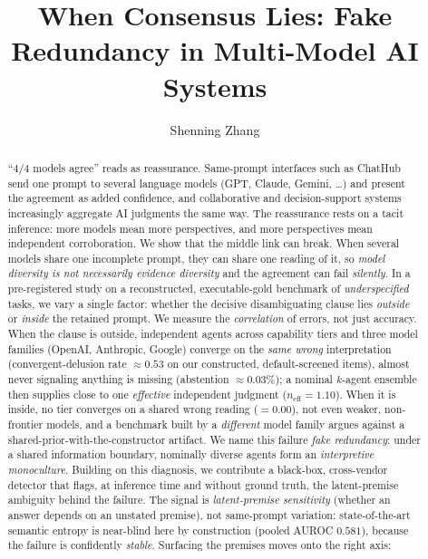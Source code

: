 \documentclass[acmsmall,screen,nonacm]{acmart}
\newcommand{\neff}{\ensuremath{n_{\mathrm{eff}}}}
\begin{document}
\title[When Consensus Lies]{When Consensus Lies: Fake Redundancy in Multi-Model AI Systems}

\author{Shenning Zhang}

\begin{abstract}
``$4/4$ models agree'' reads as reassurance. Same-prompt interfaces such as ChatHub~\cite{chathub2026} send
one prompt to several language models (GPT, Claude, Gemini, \dots) and present the agreement as added
confidence, and collaborative and decision-support systems increasingly aggregate AI judgments the same way.
The reassurance rests on a tacit inference: more models mean more perspectives, and more perspectives mean
independent corroboration. We show that the middle link can break. When several models share one incomplete
prompt, they can share one reading of it, so \emph{model diversity is not necessarily evidence diversity} and
the agreement can fail \emph{silently}.
In a pre-registered study on a reconstructed, executable-gold benchmark of \emph{underspecified} tasks, we
vary a single factor: whether the decisive disambiguating clause lies \emph{outside} or \emph{inside} the
retained prompt. We measure the \emph{correlation} of errors, not just accuracy. When the clause is
outside, independent agents across capability tiers and three model families (OpenAI, Anthropic, Google)
converge on the \emph{same wrong} interpretation (convergent-delusion rate $\approx\!0.53$ on our
constructed, default-screened items), almost never
signaling anything is missing (abstention $\approx\!0.03\%$); a nominal $k$-agent ensemble then supplies
close to one \emph{effective} independent judgment ($\neff\!=\!1.10$). When it is inside, no tier converges
on a shared wrong reading ($=\!0.00$), not even weaker, non-frontier models, and a benchmark built by a
\emph{different} model family argues against a shared-prior-with-the-constructor artifact. We name this
failure \emph{fake redundancy}: under a shared information boundary, nominally diverse agents form an
\emph{interpretive monoculture}. Building on this diagnosis, we contribute a black-box, cross-vendor detector
that flags, at inference time and without ground truth, the latent-premise ambiguity behind the failure. The signal is \emph{latent-premise sensitivity} (whether an answer depends on an unstated premise), not
same-prompt variation: state-of-the-art semantic entropy is near-blind here by construction (pooled AUROC
$0.581$), because the failure is confidently \emph{stable}. Surfacing the premises moves onto the right axis:

\end{abstract}
\end{document}
